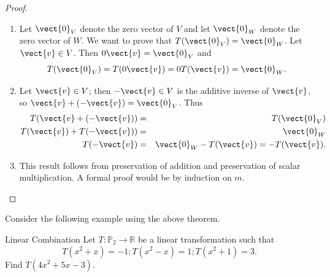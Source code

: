 \begin{proof}
\begin{enumerate}
\item Let $\vect{0}_V$ denote the zero vector of $V$ and let
$\vect{0}_W$ denote the zero vector of $W$.
We want to prove that $T(\vect{0}_V)=\vect{0}_W$.
Let $\vect{v}\in V$. 
Then $0\vect{v}=\vect{0}_V$ and
\[ T(\vect{0}_V)=T(0\vect{v})=0T(\vect{v})=\vect{0}_W.\]
\item
Let $\vect{v}\in V$; then $-\vect{v}\in V$ is the additive
inverse of $\vect{v}$, so $\vect{v} + (-\vect{v})=\vect{0}_V$.
Thus
\begin{eqnarray*}
T(\vect{v} + (-\vect{v})) & = & T(\vect{0}_V) \\
T(\vect{v}) + T(-\vect{v})) & = & \vect{0}_W \\
T(-\vect{v}) & = & \vect{0}_W - T(\vect{v}) =  - T(\vect{v}).
\end{eqnarray*}
\item This result follows from 
preservation of addition and preservation of scalar multiplication.
A formal proof would be by induction on $m$.
\end{enumerate}
\end{proof}

Consider the following example using the above theorem. 

\begin{example}{Linear Combination}\label{exa:lintransfcombination2}
Let $T:\mathbb{P}_2 \to \mathbb{R}$ be a linear transformation such that
\[ T(x^2+x)=-1; T(x^2-x)=1; T(x^2+1)=3.\]
Find $T(4x^2+5x-3)$.
\end{example}

